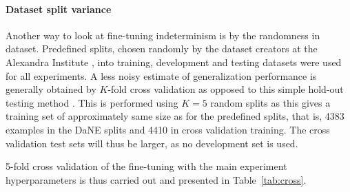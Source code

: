 \documentclass[main.tex]{subfiles}
\begin{document}
\paragraph{Dataset split variance}
Another way to look at fine-tuning indeterminism is by the randomness in dataset.
Predefined splits, chosen randomly by the dataset creators at the Alexandra Institute \cite{hvingelby2020dane}, into training, development and testing datasets were used for all experiments.
A less noisy estimate of generalization performance is generally obtained by $K$-fold cross validation as opposed to this simple hold-out testing method \cite[Sec. 1.3]{bishop2006pattern}.
This is performed using $K=5$ random splits as this gives a training set of approximately same size as for the predefined splits, that is, 4383 examples in the DaNE splits and 4410 in cross validation training.
The cross validation test sets will thus be larger, as no development set is used.

5-fold cross validation of the fine-tuning with the main experiment hyperparameters is thus carried out and presented in Table~\ref{tab:cross}.









\end{document}
